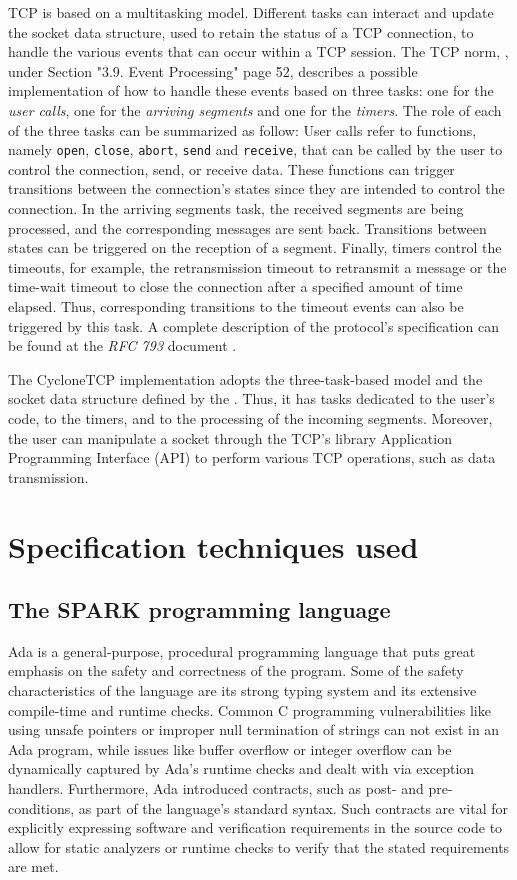 \documentclass[conference]{IEEEtran}
\begin{document}
TCP is based on a multitasking model. Different tasks can interact and update the socket data structure, used to retain the status of a TCP connection, to handle the various events that can occur within a TCP session. The TCP norm, \cite{rfc793} , under Section "3.9. Event Processing" page 52, describes a possible implementation of how to handle these events based on three tasks: one for the \emph{user calls}, one for the \emph{arriving segments} and one for the \emph{timers}. The role of each of the three tasks can be summarized as follow: User calls refer to functions, namely \texttt{open}, \texttt{close}, \texttt{abort}, \texttt{send} and \texttt{receive}, that can be called by the user to control the connection, send, or receive data. These functions can trigger transitions between the connection's states since they are intended to control the connection. In the arriving segments task, the received segments are being processed,
and the corresponding messages are sent back. Transitions between states can be triggered on the reception of a segment. Finally, timers control the timeouts, for example, the retransmission timeout to retransmit a message or the time-wait timeout to close the connection after a specified amount of time elapsed. Thus, corresponding transitions to the timeout events can also be triggered by this task. A complete description of the protocol's specification can be found at the \emph{RFC 793} document \cite{rfc793}.

The CycloneTCP implementation adopts the three-task-based model and the socket data structure defined by the \cite{rfc793}. Thus, it has tasks dedicated to the user's code, to the timers, and to the processing of the incoming segments. Moreover, the user can manipulate a socket through the TCP's library Application Programming Interface (API) to perform various TCP operations, such as data transmission.

\section{Specification techniques used}
\label{sec:spec}

\subsection{The SPARK programming language}

Ada is a general-purpose, procedural programming language that puts great emphasis on the safety and correctness of the program. Some of the safety characteristics of the language are its strong typing system and its extensive compile-time and runtime checks. Common C programming vulnerabilities like using unsafe pointers or improper null termination of strings can not exist in an Ada program, while issues like buffer overflow or integer overflow can be dynamically captured by Ada’s runtime checks and dealt with via exception handlers. Furthermore, Ada introduced contracts, such as post- and pre-conditions, as part of the language’s standard syntax. Such contracts are vital for explicitly expressing software and verification requirements in the source code to allow for static analyzers or runtime checks to verify that the stated requirements are met.
\end{document}
